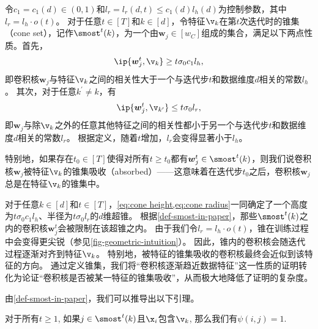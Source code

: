 \begin{definition}[锥集]\label{def-smost-in-paper}
    令$c_1 = c_1(d) \in (0,1)$和$l_r = l_r(d,t) \leq c_1(d) l_h(d)$为控制参数，其中$l_r = l_h \cdot o(t)$。
    对于任意$t \in [T]$和$k \in [d]$，令特征$\v_k$在第$t$次迭代时的{\kaishu 锥集}（cone set），记作$\smost^t(k)$，为一个由$\boldsymbol{w}_j \in [w_C]$组成的集合，满足以下两点性质。首先，
    \begin{equation}\label{eq:cone height}
        \ip{ \boldsymbol{w}_j^{t} , \v_{k} } \geq t \sigma_0 c_1 l_h,
    \end{equation}
    即卷积核$\boldsymbol{w}_j$与特征$\v_{k}$之间的相关性大于一个与迭代步$t$和数据维度$d$相关的常数$l_h$。
    其次，对于任意$k^{\prime} \neq k $，有
    \begin{equation}\label{eq:cone radius}
        \ip{ \boldsymbol{w}_{j}^{t} ,  \v_{k^{\prime}} } \leq t \sigma_0 l_r,
    \end{equation}
    即$\boldsymbol{w}_j$与除$\v_{k}$之外的任意其他特征之间的相关性都小于另一个与迭代步$t$和数据维度$d$相关的常数$l_r$。
    根据定义，随着$t$增加，$l_r$会变得显著小于$l_h$。

    特别地，如果存在$t_0 \in [T]$使得对所有$t \geq t_0$都有$\boldsymbol{w}_j^t \in \smost^{t}(k)$，则我们说卷积核$\boldsymbol{w}_j$被特征$\v_k$的锥集{\kaishu 吸收}（absorbed）——这意味着在迭代步$t_0$之后，卷积核$\boldsymbol{w}_j$总是在特征$\v_k$的锥集中。

\end{definition}

\begin{remark}[锥集直觉]
\label{remark-cone-set-intuition}
对于任意$k \in [d]$和$t \in [T]$，\cref{eq:cone height,eq:cone radius}一同确定了一个高度为$t \sigma_0 c_1 l_h$、半径为$t \sigma_0 l_r$的$d$维超锥。
根据\cref{def-smost-in-paper}，那些$\smost^{t}(k)$之内的卷积核$\boldsymbol{w}_j^t$会被限制在该超锥之内。
由于我们令$l_r = l_h \cdot o(t)$，锥在训练过程中会变得更尖锐（参见\cref{fig-geometric-intuition}）。
因此，锥内的卷积核会随迭代过程逐渐对齐到特征$\v_k$。
特别地，被特征的锥集吸收的卷积核最终会近似到该特征的方向。
通过定义锥集，我们将“卷积核逐渐趋近数据特征”这一性质的证明转化为论证“卷积核是否被某一特征的锥集吸收”，从而极大地降低了证明的复杂度。

\end{remark}

由\cref{def-smost-in-paper}，我们可以推导出以下引理。
\begin{lemma}\label{lemma-smost-delta-ij-in-paper}
    对于所有$ t \geq 1$, 如果$j \in \smost^t(k)$且$\x_i$包含$\v_k$, 那么我们有$\psi(i,j) = 1$.
\end{lemma}


